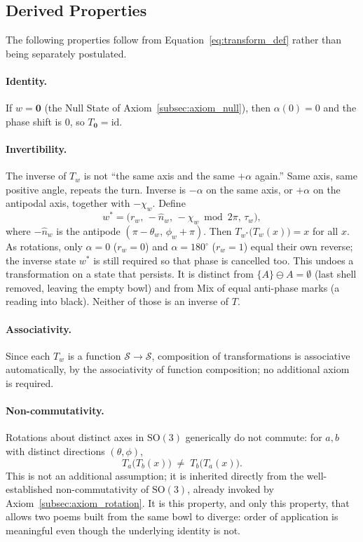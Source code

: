 \documentclass[12pt, a4paper]{article}
\begin{document}
\subsection{Derived Properties}
\label{subsec:transform_properties}
The following properties follow from Equation~\eqref{eq:transform_def}
rather than being separately postulated.

\paragraph{Identity.} If $w = \mathbf{0}$ (the Null State of
Axiom~\ref{subsec:axiom_null}), then $\alpha(0) = 0$ and the phase
shift is $0$, so $T_{\mathbf{0}} = \mathrm{id}$.

\paragraph{Invertibility.}
The inverse of $T_w$ is not ``the same axis and the same $+\alpha$ again.'' Same axis, same positive angle, repeats the turn. Inverse is $-\alpha$ on the same axis, or $+\alpha$ on the antipodal axis, together with $-\chi_w$. Define
\begin{equation}
    w^{*} = \bigl(r_w,\,-\hat n_w,\,-\chi_w \bmod 2\pi,\,\tau_w\bigr),
\end{equation}
where $-\hat n_w$ is the antipode $(\pi-\theta_w,\,\phi_w+\pi)$.
Then $T_{w^{*}}\!\big(T_w(x)\big) = x$ for all $x$. As rotations, only $\alpha=0$ ($r_w=0$) and $\alpha=180^\circ$ ($r_w=1$) equal their own reverse; the inverse state $w^{*}$ is still required so that phase is cancelled too. This undoes a transformation on a state that persists. It is distinct from $\{A\}\ominus A=\emptyset$ (last shell removed, leaving the empty bowl) and from Mix of equal anti-phase marks (a reading into black). Neither of those is an inverse of $T$.

\paragraph{Associativity.} Since each $T_w$ is a function
$\mathcal{S} \to \mathcal{S}$, composition of transformations is
associative automatically, by the associativity of function
composition; no additional axiom is required.

\paragraph{Non-commutativity.} Rotations about distinct axes in
$\mathrm{SO}(3)$ generically do not commute: for $a, b$ with distinct
directions $(\theta,\phi)$,
\begin{equation}
    T_a\big(T_b(x)\big) \;\neq\; T_b\big(T_a(x)\big).
    \label{eq:noncommute}
\end{equation}
This is not an additional assumption; it is inherited directly from
the well-established non-commutativity of $\mathrm{SO}(3)$, already
invoked by Axiom~\ref{subsec:axiom_rotation}. It is this property,
and only this property, that allows two poems built from the same
bowl to diverge: order of application is meaningful even
though the underlying identity is not.
\end{document}
